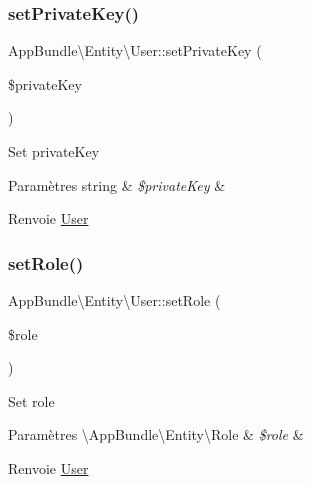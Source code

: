 \subsubsection{\texorpdfstring{set\+Private\+Key()}{setPrivateKey()}}
{\footnotesize\ttfamily App\+Bundle\textbackslash{}\+Entity\textbackslash{}\+User\+::set\+Private\+Key (\begin{DoxyParamCaption}\item[{}]{\$private\+Key }\end{DoxyParamCaption})}

Set private\+Key


\begin{DoxyParams}[1]{Paramètres}
string & {\em \$private\+Key} & \\
\hline
\end{DoxyParams}
\begin{DoxyReturn}{Renvoie}
\hyperlink{classAppBundle_1_1Entity_1_1User}{User} 
\end{DoxyReturn}
\mbox{\label{classAppBundle_1_1Entity_1_1User_ab1eb464976d6d6b645100348a7eb59fd}} 
\subsubsection{\texorpdfstring{set\+Role()}{setRole()}}
{\footnotesize\ttfamily App\+Bundle\textbackslash{}\+Entity\textbackslash{}\+User\+::set\+Role (\begin{DoxyParamCaption}\item[{\textbackslash{}\hyperlink{classAppBundle_1_1Entity_1_1Role}{App\+Bundle\textbackslash{}\+Entity\textbackslash{}\+Role}}]{\$role }\end{DoxyParamCaption})}

Set role


\begin{DoxyParams}[1]{Paramètres}
\textbackslash{}\+App\+Bundle\textbackslash{}\+Entity\textbackslash{}\+Role & {\em \$role} & \\
\hline
\end{DoxyParams}
\begin{DoxyReturn}{Renvoie}
\hyperlink{classAppBundle_1_1Entity_1_1User}{User} 
\end{DoxyReturn}
\mbox{\label{classAppBundle_1_1Entity_1_1User_a9f6b20493060944536b750b40b4471e3}} 
